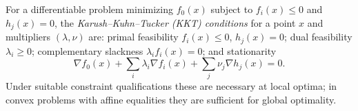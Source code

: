 
For a differentiable problem minimizing $f_0(x)$ subject to $f_i(x)\le0$ and $h_j(x)=0$, the \emph{Karush--Kuhn--Tucker (KKT) conditions} for a point $x$ and multipliers $(\lambda,\nu)$ are: primal feasibility $f_i(x)\le0$, $h_j(x)=0$; dual feasibility $\lambda_i\ge0$; complementary slackness $\lambda_i f_i(x)=0$; and stationarity
\[
\nabla f_0(x)+\sum_i\lambda_i\nabla f_i(x)+\sum_j\nu_j\nabla h_j(x)=0.
\]
Under suitable constraint qualifications these are necessary at local optima; in convex problems with affine equalities they are sufficient for global optimality.
